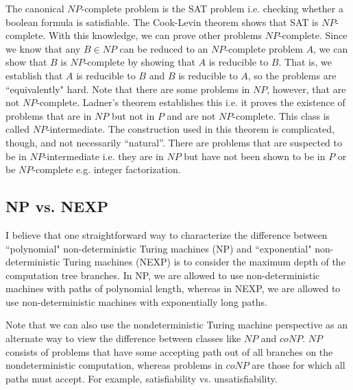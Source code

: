 \documentclass[10pt,a4paper]{article}
\begin{document}
The canonical $NP$-complete problem is the SAT problem i.e. checking whether a boolean formula is satisfiable. The Cook-Levin theorem shows that SAT is $NP$-complete. With this knowledge, we can prove other problems $NP$-complete. Since we know that any $B \in NP$ can be reduced to an $NP$-complete problem $A$, we can show that $B$ is $NP$-complete by showing that $A$ is reducible to $B$. That is, we establish that $A$ is reducible to $B$ and $B$ is reducible to $A$, so the problems are ``equivalently" hard. Note that there are some problems in $NP$, however, that are not $NP$-complete. Ladner's theorem establishes this i.e. it proves the existence of problems that are in $NP$ but not in $P$ and are not $NP$-complete. This class is called $NP$-intermediate. The construction used in this theorem is complicated, though, and not necessarily ``natural''. There are problems that are suspected to be in $NP$-intermediate i.e. they are in $NP$ but have not been shown to be in $P$ or be $NP$-complete e.g. integer factorization.

\subsection{NP vs. NEXP}

I believe that one straightforward way to characterize the difference between ``polynomial" non-deterministic Turing machines (NP) and ``exponential" non-deterministic Turing machines (NEXP) is to consider the maximum depth of the computation tree branches. In NP, we are allowed to use non-deterministic machines with paths of polynomial length, whereas in NEXP, we are allowed to use non-deterministic machines with exponentially long paths.

Note that we can also use the nondeterministic Turing machine perspective as an alternate way to view the difference between classes like $NP$ and $coNP$. $NP$ consists of problems that have some accepting path out of all branches on the nondeterministic computation, whereas problems in $coNP$ are those for which all paths must accept. For example, satisfiability vs. unsatisfiability.







\end{document}
